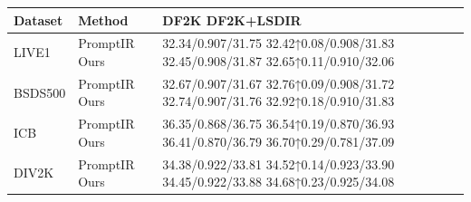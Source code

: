 \begin{tabular}{lll}
\toprule
Dataset & Method & DF2K DF2K+LSDIR \\
\midrule
LIVE1 & PromptIR Ours & 32.34/0.907/31.75 32.42↑0.08/0.908/31.83 32.45/0.908/31.87 32.65↑0.11/0.910/32.06 \\
BSDS500 & PromptIR Ours & 32.67/0.907/31.67 32.76↑0.09/0.908/31.72 32.74/0.907/31.76 32.92↑0.18/0.910/31.83 \\
ICB & PromptIR Ours & 36.35/0.868/36.75 36.54↑0.19/0.870/36.93 36.41/0.870/36.79 36.70↑0.29/0.781/37.09 \\
DIV2K & PromptIR Ours & 34.38/0.922/33.81 34.52↑0.14/0.923/33.90 34.45/0.922/33.88 34.68↑0.23/0.925/34.08 \\
\bottomrule
\end{tabular}
